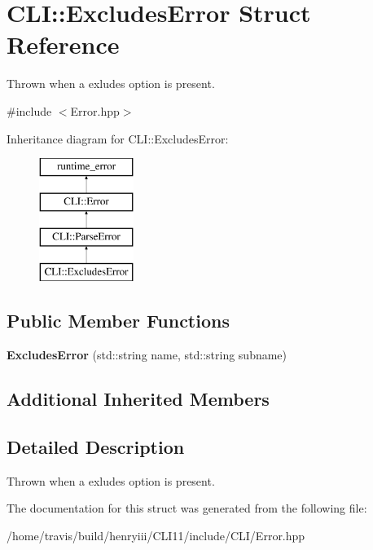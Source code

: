 \hypertarget{struct_c_l_i_1_1_excludes_error}{}\section{C\+LI\+:\+:Excludes\+Error Struct Reference}
\label{struct_c_l_i_1_1_excludes_error}


Thrown when a exludes option is present.  




{\ttfamily \#include $<$Error.\+hpp$>$}

Inheritance diagram for C\+LI\+:\+:Excludes\+Error\+:\begin{figure}[H]
\begin{center}
\leavevmode
\includegraphics[height=4.000000cm]{struct_c_l_i_1_1_excludes_error}
\end{center}
\end{figure}
\subsection*{Public Member Functions}
\begin{DoxyCompactItemize}
\item 
\mbox{\label{struct_c_l_i_1_1_excludes_error_ac019c598d7bd8bd6a370aaf05f0ddda2}} 
{\bfseries Excludes\+Error} (std\+::string name, std\+::string subname)
\end{DoxyCompactItemize}
\subsection*{Additional Inherited Members}


\subsection{Detailed Description}
Thrown when a exludes option is present. 

The documentation for this struct was generated from the following file\+:\begin{DoxyCompactItemize}
\item 
/home/travis/build/henryiii/\+C\+L\+I11/include/\+C\+L\+I/Error.\+hpp\end{DoxyCompactItemize}
